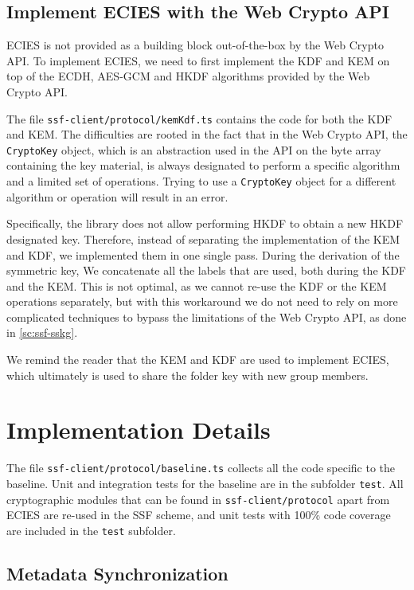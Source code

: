 \subsection{Implement ECIES with the Web Crypto API}\label{sc:implement-ecies}

ECIES is not provided as a building block out-of-the-box by the Web Crypto API.
To implement ECIES, we need to first implement 
the KDF and KEM on top of the ECDH, AES-GCM and HKDF algorithms provided
by the Web Crypto API.

The file \texttt{ssf-client/protocol/kemKdf.ts} contains the code for both the KDF and KEM.
The difficulties are rooted in the fact that
in the Web Crypto API, the \texttt{CryptoKey}
object, which is an abstraction used in the API on the byte array containing the key material,
is always designated to perform a specific algorithm and
a limited set of operations.
Trying to use a \texttt{CryptoKey} object for a different algorithm or operation
will result in an error.

Specifically, the library does not allow performing 
HKDF to obtain a new HKDF designated key.
Therefore, instead of separating the implementation
of the KEM and KDF, we implemented them in one single pass.
During the derivation of the symmetric key,
We concatenate all the labels that are used, both
during the KDF and the KEM. This is not optimal,
as we cannot re-use the KDF or the KEM operations
separately, but with this workaround we do not need
to rely on more complicated techniques 
to bypass the limitations of the Web Crypto API,
as done in \cref{sc:ssf-sskg}.

We remind the reader that the KEM and KDF are used to
implement ECIES, which ultimately is used to
share the folder key with new group members.

\section{Implementation Details}\label{sc:baseline-protocol}

The file \texttt{ssf-client/protocol/baseline.ts} collects all the code specific to the baseline.
Unit and integration tests for the baseline are in the subfolder \texttt{test}.
All cryptographic modules that can be found in
\texttt{ssf-client/protocol} apart from ECIES are re-used in the SSF scheme,
and unit tests with 100\% code coverage are included in the
\texttt{test} subfolder.

\subsection{Metadata Synchronization}\label{sc:metadata-synchronization}

